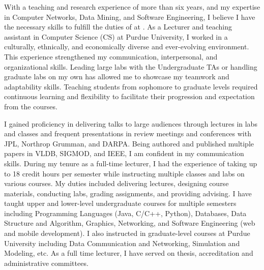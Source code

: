 \documentclass[10pt]{article}
\renewcommand*\paragraph[1]{}
\begin{document}
\paragraph{2 and 3) Demonstrated ability to teach and interact with both undergraduate and graduate students}
With a teaching and research 
experience of more than six years, and my expertise in Computer Networks, Data Mining, and Software Engineering, I believe I have the necessary skills to fulfill the duties of  \PositionName{} at \InstitutionName.
As a Lecturer and teaching assistant in Computer Science (CS) at Purdue University, I worked in a culturally, ethnically, and economically diverse and ever-evolving environment. This experience strengthened my communication, interpersonal, and organizational skills. Leading large labs with the Undergraduate TAs or handling graduate labs on my own has allowed me to showcase my teamwork and adaptability skills. Teaching students from sophomore to graduate levels required continuous learning and flexibility to facilitate their progression and expectation from the courses. 

\paragraph{4) Good communication skills.}
I gained proficiency in delivering talks to large audiences through lectures in labs and classes and frequent presentations in review meetings and conferences with JPL, Northrop Grumman, and DARPA. Being authored and published multiple papers in VLDB, SIGMOD, and IEEE, I am confident in my communication skills. During my tenure as a full-time lecturer, I had the experience of taking up to 18 credit hours per semester while instructing multiple classes and 
labs on various courses. My duties included delivering lectures, designing course materials, conducting labs, grading assignments, and providing advising. I have taught upper and lower-level undergraduate courses for multiple semesters including Programming Languages (Java, C/C++, Python), Databases, Data Structure and Algorithm, Graphics, Networking, and Software Engineering (web and mobile development). I also instructed in graduate-level courses at Purdue University including Data Communication and Networking, Simulation and Modeling, etc. As a full time lecturer, I have served on thesis, accreditation and administrative committees.
\end{document}
